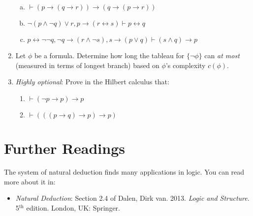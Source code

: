 \begin{enumerate}[\thesection.1]
\begin{enumerate}[(a)]
\item $\vdash (p\to (q\to r))\to (q\to (p\to r))$

\item $\neg(p\land \neg q)\lor r, p\to (r\leftrightarrow s)\vdash p\leftrightarrow q$

\item $p\leftrightarrow \neg\neg q, \neg q\to (r\land \neg s), s\to (p\lor q)\vdash (s\land q)\to p$

\end{enumerate} 

		\item Let $\phi$ be a formula. Determine how long the tableau for $\{\neg\phi\}$ can \emph{at most} (measured in terms of longest branch) based on $\phi$'s complexity $c(\phi)$.

		\item \emph{Highly optional}: Prove in the Hilbert calculus that:
		
		\begin{enumerate}
		
			\item $\vdash (\neg p\to p)\to p$
			
			\item $\vdash (((p\to q)\to p)\to p)$
		
		\end{enumerate}

	\end{enumerate}

\section{Further Readings}

The system of natural deduction finds many applications in logic. You can read more about it in:

\begin{itemize}
	
		\item \emph{Natural Deduction}: Section 2.4 of Dalen, Dirk van. 2013. \emph{Logic and Structure}. 5$^\text{th}$ edition. London, UK: Springer.
			
	\end{itemize}


\vfill

